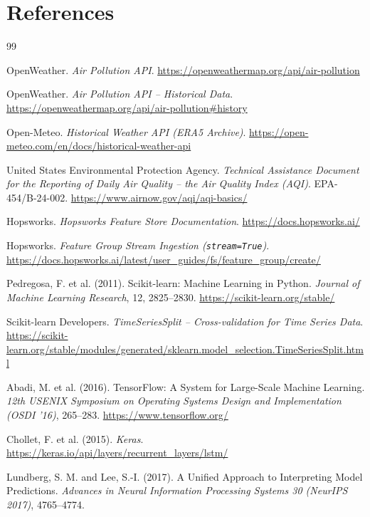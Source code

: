 \documentclass[11pt,a4paper]{article}
\begin{document}
\section*{References}

\begin{thebibliography}{99}
\small

OpenWeather. \emph{Air Pollution API}.
\url{https://openweathermap.org/api/air-pollution}

OpenWeather. \emph{Air Pollution API -- Historical Data}.
\url{https://openweathermap.org/api/air-pollution#history}

Open-Meteo. \emph{Historical Weather API (ERA5 Archive)}.
\url{https://open-meteo.com/en/docs/historical-weather-api}

United States Environmental Protection Agency.
\emph{Technical Assistance Document for the Reporting of Daily Air Quality --
the Air Quality Index (AQI)}. EPA-454/B-24-002.
\url{https://www.airnow.gov/aqi/aqi-basics/}

Hopsworks. \emph{Hopsworks Feature Store Documentation}.
\url{https://docs.hopsworks.ai/}

Hopsworks. \emph{Feature Group Stream Ingestion (\texttt{stream=True})}.
\url{https://docs.hopsworks.ai/latest/user_guides/fs/feature_group/create/}

Pedregosa, F. et al. (2011). Scikit-learn: Machine Learning in Python.
\emph{Journal of Machine Learning Research}, 12, 2825--2830.
\url{https://scikit-learn.org/stable/}

Scikit-learn Developers. \emph{TimeSeriesSplit -- Cross-validation for Time
Series Data}.
\url{https://scikit-learn.org/stable/modules/generated/sklearn.model_selection.TimeSeriesSplit.html}

Abadi, M. et al. (2016). TensorFlow: A System for Large-Scale Machine
Learning. \emph{12th USENIX Symposium on Operating Systems Design and
Implementation (OSDI '16)}, 265--283.
\url{https://www.tensorflow.org/}

Chollet, F. et al. (2015). \emph{Keras}.
\url{https://keras.io/api/layers/recurrent_layers/lstm/}

Lundberg, S. M. and Lee, S.-I. (2017). A Unified Approach to Interpreting Model
Predictions. \emph{Advances in Neural Information Processing Systems 30
(NeurIPS 2017)}, 4765--4774.


\end{thebibliography}
\end{document}
